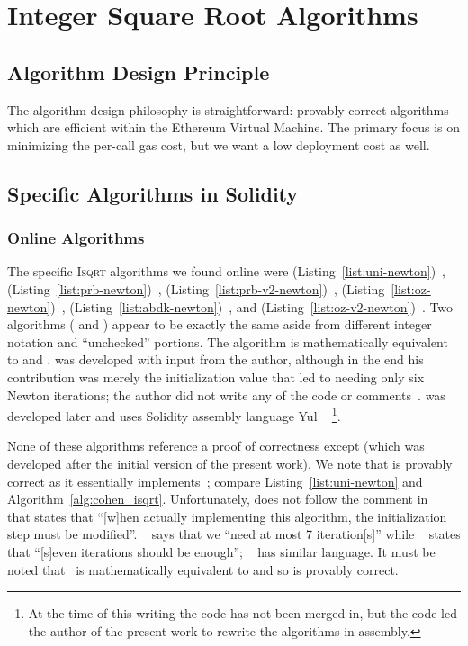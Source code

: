 \section{Integer Square Root Algorithms}

\subsection{Algorithm Design Principle}

The algorithm design philosophy is straightforward:
provably correct algorithms which are efficient within the
Ethereum Virtual Machine.
The primary focus is on minimizing the per-call gas cost,
but we want a low deployment cost as well.

\subsection{Specific Algorithms in Solidity}

\subsubsection{Online Algorithms}

The specific \textsc{Isqrt} algorithms we found online were
\Uniswap{} (Listing~\ref{list:uni-newton})~\cite{uniswap-v2},
\prb{} (Listing~\ref{list:prb-newton})~\cite{prb-math},
\prbTwo{} (Listing~\ref{list:prb-v2-newton})~\cite{prb-math-v2},
\OpenZeppelin{} (Listing~\ref{list:oz-newton})~\cite{open-zeppelin},
\abdk{} (Listing~\ref{list:abdk-newton})~\cite{abdk-consulting}, and
\OpenZeppelinTwo{} (Listing~\ref{list:oz-v2-newton})~\cite{open-zeppelin-v2}.
Two algorithms (\prb{} and \abdk{})
appear to be exactly the same aside from different integer notation
and ``unchecked'' portions.
The \OpenZeppelin{} algorithm is mathematically equivalent
to \prb{} and \abdk{}.
\OpenZeppelinTwo{} was developed with input from the author,
although in the end his contribution was merely
the initialization value that led to needing only six Newton iterations;
the author did not write any of the code
or comments~\cite{OpenZeppelinIsqrtCommit}.
\prbTwo{} was developed later and uses Solidity assembly language Yul%
~\cite{YulLanguage}%
\footnote{At the time of this writing the code has not been merged in,
but the code led the author of the present work to
rewrite the algorithms in assembly.}.

None of these algorithms reference a proof of correctness
except \OpenZeppelinTwo{}
(which was developed after the initial version of the present work).
We note that \Uniswap{}
is provably correct as it essentially
implements~\cite[Algorithm 1.7.1]{cohen1993};
compare Listing~\ref{list:uni-newton} and Algorithm~\ref{alg:cohen_isqrt}.
Unfortunately, \Uniswap{} does not follow the comment
in~\cite[Chapter 1.7, Remarks]{cohen1993} that states that
``[w]hen actually implementing this algorithm,
the initialization step must be modified''.
\OpenZeppelin{}~\cite{open-zeppelin}
says that we ``need at most 7 iteration[s]''
while  \abdk{}~\cite{abdk-consulting} states that
``[s]even iterations should be enough'';
\prb{}~\cite{prb-math} has similar language.
It must be noted that~\prbTwo{} is mathematically equivalent
to \UnrolledOne{} and so is provably correct.

